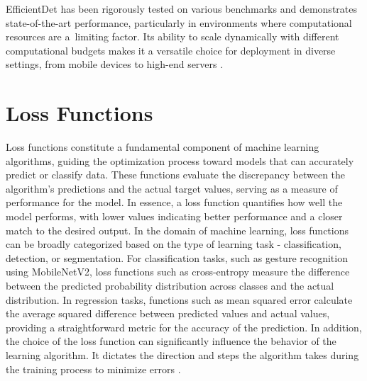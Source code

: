 EfficientDet has been rigorously tested on various benchmarks and demonstrates state-of-the-art performance, particularly in environments where computational resources are a~limiting factor. Its ability to scale dynamically with different computational budgets makes it a versatile choice for deployment in diverse settings, from mobile devices to high-end servers \cite{tan2020efficientdet}.

\section{Loss Functions}
Loss functions constitute a fundamental component of machine learning algorithms, guiding the optimization process toward models that can accurately predict or classify data. These functions evaluate the discrepancy between the algorithm's predictions and the actual target values, serving as a measure of performance for the model. In essence, a loss function quantifies how well the model performs, with lower values indicating better performance and a closer match to the desired output. In the domain of machine learning, loss functions can be broadly categorized based on the type of learning task - classification, detection, or segmentation. For classification tasks, such as gesture recognition using MobileNetV2, loss functions such as cross-entropy measure the difference between the predicted probability distribution across classes and the actual distribution. In regression tasks, functions such as mean squared error calculate the average squared difference between predicted values and actual values, providing a straightforward metric for the accuracy of the prediction. In addition, the choice of the loss function can significantly influence the behavior of the learning algorithm. It dictates the direction and steps the algorithm takes during the training process to minimize errors \cite{Wang2020ComprehensiveSF}.

